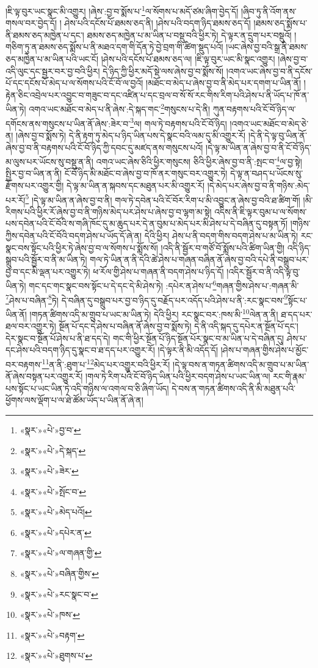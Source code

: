 །ཇི་ལྟ་བུར་ཡང་སྣང་མི་འགྱུར། །ཞེས་:བྱ་བ་སྨོས་པ་\footnote{«སྣར་»«པེ་»བྱ་བ་}ལ་སོགས་པ་མདོ་ཙམ་ཞིག་བྱེད་དོ། །ཞིབ་ཏུ་ནི་འོག་ནས་གསལ་བར་བྱེད་དོ། །
ཤེས་པའི་དངོས་པོ་ཐམས་ཅད་ནི། །ཤེས་པའི་བདག་ཉིད་ཐམས་ཅད་དོ། །ཐམས་ཅད་སྨོས་པ་ནི་ཐམས་ཅད་མཁྱེན་པ་དང་། ཐམས་ཅད་མཁྱེན་པ་མ་ཡིན་པ་བསྡུ་བའི་ཕྱིར་ཏེ། དེ་ལྟར་ན་དྲུག་པར་བསྡུའོ། །གཅིག་ཏུ་ན་ཐམས་ཅད་སྨོས་པ་ནི་མཐའ་དག་གི་དོན་ཏེ་བྱེ་བྲག་གི་ཚིག་སྡུད་པའོ། །ཡང་ཞེས་བྱ་བའི་སྒྲ་ནི་ཐམས་ཅད་མཁྱེན་པ་མ་ཡིན་པའི་ཡང་ངོ། །ཤེས་པའི་དངོས་པོ་ཐམས་ཅད་ལ། །ཇི་ལྟ་བུར་ཡང་མི་སྣང་འགྱུར། །ཞེས་བྱ་བ་འདི་ལུང་དང་སྦྱར་བར་བྱ་བའི་ཕྱིར། དེ་ཉིད་ཀྱི་ཕྱིར་མདོ་སྡེ་ལས་ཞེས་བྱ་བ་སྨོས་སོ། །འགའ་ཡང་ཞེས་བྱ་བ་ནི་དངོས་པོ་དང་དངོས་པོ་མེད་པ་ལ་སོགས་པའི་ངོ་བོ་ལ་བྱའོ། །མཐོང་བ་མེད་པ་ཞེས་བྱ་བ་ནི་མེད་པར་དགག་པ་ཡིན་ནོ། །རྟེན་ཅིང་འབྲེལ་པར་འབྱུང་བ་གཟུང་བ་དང་འཛིན་པ་དང་བྲལ་བ་སོ་སོ་རང་གིས་རིག་པའི་ཤེས་པ་ནི་ཡོད་པ་ཁོ་ན་ཡིན་ཏེ། འགའ་ཡང་མཐོང་བ་མེད་པ་ནི་ཞེས་:དེ་སྐད་གང་\footnote{«སྣར་»«པེ་»དེ་སྐད་}གསུངས་པ་དེ་ནི། ཀུན་བརྟགས་པའི་ངོ་བོ་ཉིད་ལ་དགོངས་ནས་གསུངས་པ་ཡིན་ནོ་ཞེས་:ཟེར་བ་\footnote{«སྣར་»«པེ་»ཟེར་}ལ། གལ་ཏེ་བརྟགས་པའི་ངོ་བོ་ཉིད། །འགའ་ཡང་མཐོང་བ་མེད་ཅེ་ན། །ཞེས་བྱ་བ་སྨོས་ཏེ། དེ་ནི་རྟག་ཏུ་མེད་པ་ཉིད་ཡིན་པས་དེ་སྣང་བའི་ལམ་དུ་མི་འགྱུར་རོ། །དེ་ནི་དེ་ལྟ་བུ་ཡིན་ནོ་ཞེས་བྱ་བ་ནི་བརྟགས་པའི་ངོ་བོ་ཉིད་ཀྱི་དབང་དུ་མཛད་ནས་གསུངས་པའོ། །དེ་ལྟ་མ་ཡིན་ན་ཞེས་བྱ་བ་ནི་ངོ་བོ་ཉིད་མ་ལུས་པར་ཡོངས་སུ་བསྡུ་ན་ནི། འགའ་ཡང་ཞེས་ཅིའི་ཕྱིར་གསུངས། ཅིའི་ཕྱིར་ཞེས་བྱ་བ་ནི་:སྤང་བ་\footnote{«སྣར་»«པེ་»སྤོང་བ་}ལ་བྱ་སྟེ། སྤྱིར་བྱ་བ་ཡིན་ན་ནི། ངོ་བོ་ཉིད་མི་མཐོང་བ་ཞེས་བྱ་བ་ཁོ་ནར་གསུང་བར་འགྱུར་ཏེ། དེ་ལྟ་ན་བཤད་པ་ཡོངས་སུ་རྫོགས་པར་འགྱུར་གྱི། དེ་ལྟ་མ་ཡིན་ན་སྐབས་དང་མཐུན་པར་མི་འགྱུར་རོ། །དེ་མེད་པར་ཞེས་བྱ་བ་ནི་གཉིས་:མེད་པར་རོ།\footnote{«སྣར་»«པེ་»མེད་པའོ།} །དེ་ལྟ་མ་ཡིན་ན་ཞེས་བྱ་བ་ནི། གལ་ཏེ་དབེན་པའི་ངོ་བོར་རིག་པ་མི་འབྱུང་ན་ཞེས་བྱ་བའི་ཐ་ཚིག་གོ། །མི་རིགས་པའི་ཕྱིར་རོ་ཞེས་བྱ་བ་ནི་གཉིས་མེད་པར་ཤེས་པ་ཞེས་བྱ་བ་ལྷག་མ་སྟེ། འདིས་ནི་ཇི་ལྟར་བུམ་པ་ལ་སོགས་པས་དབེན་པའི་ངོ་བོའི་ས་གཞི་ཁོང་དུ་མ་ཆུད་པར་དེ་ན་བུམ་པ་མེད་པར་མི་ཤེས་པ་དེ་བཞིན་དུ་བསྟན་ཏོ། །གཉིས་ཀྱིས་དབེན་པའི་ངོ་བོའི་བདག་ཤེས་པ་ཡོད་དོ་ཞེ་ན། དེའི་ཕྱིར། ཤེས་པ་ནི་བདག་གིས་བདག་ཤེས་པ་མ་ཡིན་ཏེ། རང་སྣང་བས་སྟོང་པའི་ཕྱིར་ཏེ་ཞེས་བྱ་བ་ལ་སོགས་པ་སྨོས་སོ། །འདི་ནི་སྦྱོར་བ་གཙོ་བོ་སྨོས་པའི་ཚིག་ཡིན་གྱི། འདི་ཉིད་སྒྲུབ་པའི་སྦྱོར་བ་ནི་མ་ཡིན་ཏེ། གལ་ཏེ་ཡིན་ན་ནི་དེའི་ཚེ་ཤེས་པ་གཞན་བཞིན་ནོ་ཞེས་བྱ་བའི་དཔེ་ནི་བསྒྲུབ་པར་བྱ་བ་དང་མི་ལྡན་པར་འགྱུར་ཏེ། ཕ་རོལ་གྱི་ཤེས་པ་གཞན་ནི་བདག་ཤེས་པ་ཉིད་དོ། །འདིར་སྦྱོར་བ་ནི་འདི་ལྟ་བུ་ཡིན་ཏེ། གང་དང་གང་སྣང་བས་སྟོང་པ་དེ་དང་དེ་མི་ཤེས་ཏེ། :དཔེར་ན་ཤེས་པ་\footnote{«སྣར་»«པེ་»དཔེར་ན་}གཞན་གྱིས་ཤེས་པ་:གཞན་མི་\footnote{«སྣར་»«པེ་»ལ་གཞན་གྱི་}ཤེས་པ་བཞིན་\footnote{«སྣར་»«པེ་»བཞིན་གྱིས་}ཏེ། དེ་བཞིན་དུ་བསྒྲུབ་པར་བྱ་བ་ཉིད་དུ་བརྗོད་པར་འདོད་པའི་ཤེས་པ་ནི་:རང་སྣང་བས་\footnote{«སྣར་»«པེ་»རང་སྣང་བ་}སྟོང་པ་ཡིན་ནོ། །གཏན་ཚིགས་འདི་མ་གྲུབ་པ་ཡང་མ་ཡིན་ཏེ། དེའི་ཕྱིར། རང་སྣང་བར་:ཁས་མི་\footnote{«སྣར་»«པེ་»ཁས་}ལེན་ན་ནི། ཐ་དད་པར་ཐལ་བར་འགྱུར་ཏེ། སྔོན་པོ་དང་དེ་ཤེས་པ་བཞིན་ནོ་ཞེས་བྱ་བ་སྨོས་ཏེ། དེ་ནི་འདི་སྐད་དུ་དཔེར་ན་སྔོན་པོ་དང་། དེར་སྣང་བ་སྔོན་པོ་ཤེས་པ་ནི་ཐ་དད་དེ། གང་གི་ཕྱིར་སྔོན་པོ་ཉིད་སྔོན་པོར་སྣང་བ་མ་ཡིན་པ་དེ་བཞིན་དུ། ཤེས་པ་དང་ཤེས་པའི་བདག་ཉིད་དུ་སྣང་བ་ཐ་དད་པར་འགྱུར་རོ། །དེ་ལྟར་ནི་མི་འདོད་དོ། །ཤེས་པ་གཞན་གྱིས་ཤེས་པ་མྱོང་བར་བརྟགས་\footnote{«སྣར་»«པེ་»བརྟག་}ན་ནི་:ཐུག་པ་\footnote{«སྣར་»«པེ་»ཐུགས་པ་}མེད་པར་འགྱུར་བའི་ཕྱིར་རོ། །དེ་ལྟ་བས་ན་གཏན་ཚིགས་འདི་མ་གྲུབ་པ་མ་ཡིན་ནོ་ཞེས་བསྟན་པར་འགྱུར་རོ། །གལ་ཏེ་རིག་པའི་ངོ་བོ་ཉིད་ཡིན་པའི་ཕྱིར་བདག་ཤེས་པ་ཡང་ཡིན་ལ། རང་གི་རྣམ་པས་སྟོང་པ་ཡང་ཡིན་ཏེ་འདི་གཉིས་ལ་འགལ་བ་ཅི་ཞིག་ཡོད། དེ་བས་ན་གཏན་ཚིགས་འདི་ནི་མི་མཐུན་པའི་ཕྱོགས་ལས་ལྡོག་པ་ལ་ཐེ་ཚོམ་ཡོད་པ་ཡིན་ནོ་ཞེ་ན། 